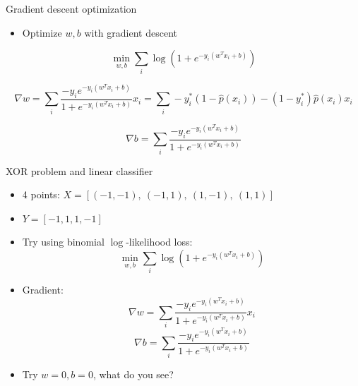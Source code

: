 \documentclass[12pt,notes,mathserif]{beamer}
\providecommand{\tightlist}{%
	\setlength{\itemsep}{0pt}\setlength{\parskip}{0pt}}
\begin{document}
\begin{frame}{Gradient descent optimization}

\begin{itemize}
\tightlist
\item
  Optimize \(w, b\) with gradient descent
\end{itemize}

\[\min_{w,b}\sum_{i}\log(1+e^{-y_{i}(w^{{T}}x_{i}+b)})\]

\[\nabla w=\sum_{i}\frac{-{y}_{i}e^{-y_{i}(w^{{T}}x_{i}+b)}}{1+e^{-y_{i}(w^{{T}}x_{i}+b)}}x_{i}=\sum_{i}-{y}_{i}^{*}(1-\hat{p}(x_{i}))-(1-{y}_{i}^{*})\hat{p}(x_{i})x_{i}\]

\[\nabla b=\sum_{i}\frac{-{y}_{i}e^{-y_{i}(w^{{T}}x_{i}+b)}}{1+e^{-y_{i}(w^{{T}}x_{i}+b)}}\]

\end{frame}

\begin{frame}{XOR problem and linear classifier}

\begin{itemize}
\item
  4 points: \({X}=[(-1,-1),\ (-1,1),\ (1,-1),\ (1,1)]\)
\item
  \(Y=[-1, 1, 1, -1]\)
\item
  Try using binomial \(\log\)-likelihood loss: \[
  \min_{w,b}\sum_{i}\log(1+e^{-y_{i}(w^{{T}}x_{i}+ b)})
  \]
\item
  Gradient:
  \[\nabla w=\sum_{i}\frac{-{y}_{i}e^{-y_{i}(w^{{T}}x_{i}+b)}}{1+e^{-{y}_i(w^{{T}}x_{i}+b)}}x_{i}\]
  \[\nabla b=\sum_{i}\frac{-{y}_{i}e^{-y_{i}(w^{{T}}x_{i}+b)}}{1+e^{-{y}_i(w^{{T}}x_{i}+b)}}\]
\item
  Try \(w=0, b=0\), what do you see?
\end{itemize}

\end{frame}
\end{document}

